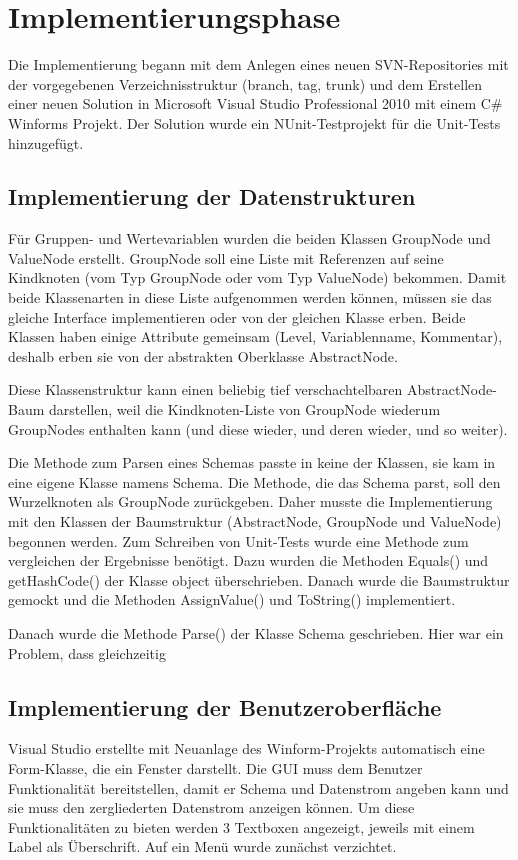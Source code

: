 \section{Implementierungsphase} 
\label{sec:Implementierungsphase}
Die Implementierung begann mit dem Anlegen eines neuen SVN-Repositories mit der vorgegebenen Verzeichnisstruktur (branch, tag, trunk) und dem Erstellen einer neuen Solution in Microsoft Visual Studio Professional 2010 mit einem C\# Winforms Projekt. Der Solution wurde ein NUnit-Testprojekt für die Unit-Tests hinzugefügt.

\subsection{Implementierung der Datenstrukturen}
\label{sec:ImplementierungDatenstrukturen}
Für Gruppen- und Wertevariablen wurden die beiden Klassen GroupNode und ValueNode erstellt. GroupNode soll eine Liste mit Referenzen auf seine Kindknoten (vom Typ GroupNode oder vom Typ ValueNode) bekommen. Damit beide Klassenarten in diese Liste aufgenommen werden können, müssen sie das gleiche Interface implementieren oder von der gleichen Klasse erben. Beide Klassen haben einige Attribute gemeinsam (Level, Variablenname, Kommentar), deshalb erben sie von der abstrakten Oberklasse AbstractNode.

Diese Klassenstruktur kann einen beliebig tief verschachtelbaren AbstractNode-Baum darstellen, weil die Kindknoten-Liste von GroupNode wiederum GroupNodes enthalten kann (und diese wieder, und deren wieder, und so weiter).

Die Methode zum Parsen eines Schemas passte in keine der Klassen, sie kam in eine eigene Klasse namens Schema. Die Methode, die das Schema parst, soll den Wurzelknoten als GroupNode zurückgeben. Daher musste die Implementierung mit den Klassen der Baumstruktur (AbstractNode, GroupNode und ValueNode) begonnen werden. Zum Schreiben von Unit-Tests wurde eine Methode zum vergleichen der Ergebnisse benötigt. Dazu wurden die Methoden Equals() und getHashCode() der Klasse object überschrieben. Danach wurde die Baumstruktur gemockt und die Methoden AssignValue() und ToString() implementiert.

Danach wurde die Methode Parse() der Klasse Schema geschrieben. Hier war ein Problem, dass gleichzeitig 


\subsection{Implementierung der Benutzeroberfläche}
\label{sec:ImplementierungBenutzeroberflaeche}
Visual Studio erstellte mit Neuanlage des Winform-Projekts automatisch eine Form-Klasse, die ein Fenster darstellt.
Die \ac{GUI} muss dem Benutzer Funktionalität bereitstellen, damit er Schema und Datenstrom angeben kann und sie muss den zergliederten Datenstrom anzeigen können.
Um diese Funktionalitäten zu bieten werden 3 Textboxen angezeigt, jeweils mit einem Label als Überschrift. Auf ein Menü wurde zunächst verzichtet.

